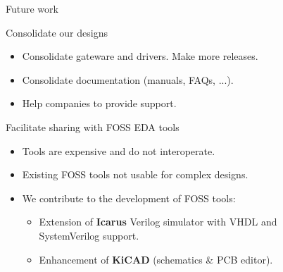 \documentclass[compress,red]{beamer}
\begin{document}
\begin{frame}{Future work}

  \begin{block}{Consolidate our designs}
    \begin{itemize}
    \item Consolidate gateware and drivers. Make more releases.
    \item Consolidate documentation (manuals, FAQs, ...).
    \item Help companies to provide support.
    \end{itemize}
  \end{block}

  \begin{block}{Facilitate sharing with FOSS EDA tools}
    \begin{itemize}
    \item Tools are expensive and do not interoperate.
    \item Existing FOSS tools not usable for complex designs.
    \item We contribute to the development of FOSS tools:
      \begin{itemize}
      \item Extension of \textbf{Icarus} Verilog simulator with VHDL and \\ SystemVerilog support.
      \item Enhancement of \textbf{KiCAD} (schematics \& PCB editor).
      \end{itemize}
    \end{itemize}
  \end{block}


\end{frame}
\end{document}
